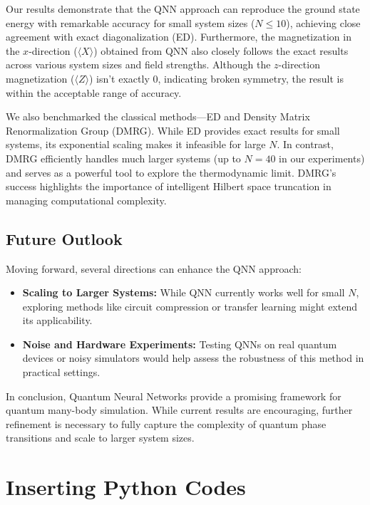 \documentclass[pre,twocolumn,floatfix]{revtex4-1}
\begin{document}
Our results demonstrate that the QNN approach can reproduce the ground state energy with remarkable accuracy for small system sizes ($N \leq 10$), achieving close agreement with exact diagonalization (ED). Furthermore, the magnetization in the $x$-direction ($\langle X \rangle$) obtained from QNN also closely follows the exact results across various system sizes and field strengths. Although the $z$-direction magnetization ($\langle Z \rangle$) isn't exactly 0, indicating broken symmetry, the result is within the acceptable range of accuracy. 

We also benchmarked the classical methods—ED and Density Matrix Renormalization Group (DMRG). While ED provides exact results for small systems, its exponential scaling makes it infeasible for large $N$. In contrast, DMRG efficiently handles much larger systems (up to $N=40$ in our experiments) and serves as a powerful tool to explore the thermodynamic limit. DMRG's success highlights the importance of intelligent Hilbert space truncation in managing computational complexity.

\subsection{Future Outlook}
Moving forward, several directions can enhance the QNN approach:

\begin{itemize}
    \item \textbf{Scaling to Larger Systems:} While QNN currently works well for small $N$, exploring methods like circuit compression or transfer learning might extend its applicability.
    \item \textbf{Noise and Hardware Experiments:} Testing QNNs on real quantum devices or noisy simulators would help assess the robustness of this method in practical settings.
\end{itemize}

In conclusion, Quantum Neural Networks provide a promising framework for quantum many-body simulation. While current results are encouraging, further refinement is necessary to fully capture the complexity of quantum phase transitions and scale to larger system sizes.


\appendix
\section{Inserting Python Codes}
\end{document}

